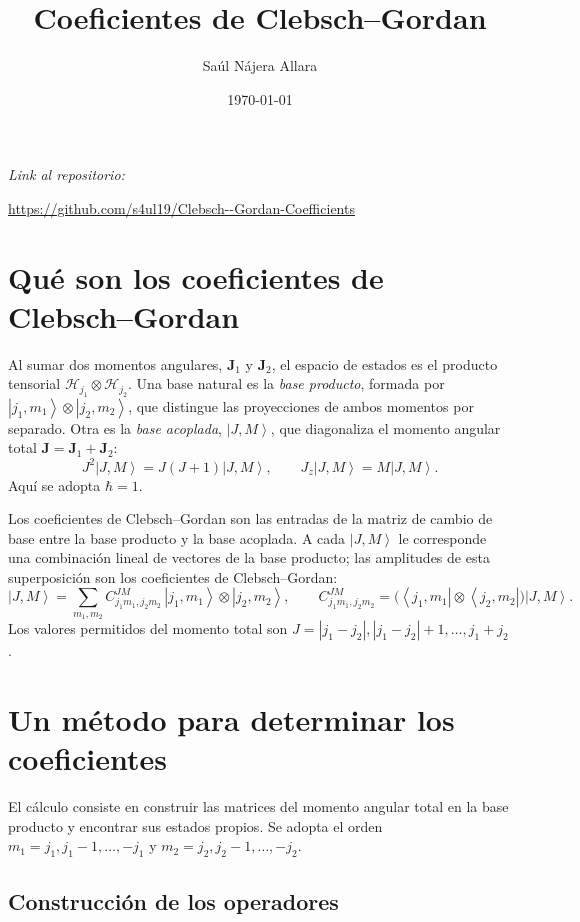 \documentclass[11pt,a4paper]{article}
\title{Coeficientes de Clebsch--Gordan}
\author{Saúl Nájera Allara}
\date{\today}
\newcommand{\ket}[1]{\left|#1\right\rangle}
\newcommand{\bra}[1]{\left\langle#1\right|}
\begin{document}
\maketitle
\hypertarget{indice}{}
\tableofcontents
\clearpage
\textit{Link al repositorio:}

\url{https://github.com/s4ul19/Clebsch--Gordan-Coefficients}  

\section{Qué son los coeficientes de Clebsch--Gordan}

Al sumar dos momentos angulares, $\mathbf{J}_1$ y $\mathbf{J}_2$, el espacio
de estados es el producto tensorial
$\mathcal{H}_{j_1}\otimes\mathcal{H}_{j_2}$. Una base natural es la
\emph{base producto}, formada por
$\ket{j_1,m_1}\otimes\ket{j_2,m_2}$, que distingue las proyecciones de
ambos momentos por separado. Otra es la \emph{base acoplada},
$\ket{J,M}$, que diagonaliza el momento angular total
$\mathbf{J}=\mathbf{J}_1+\mathbf{J}_2$:
\begin{equation}
 J^2\ket{J,M}=J(J+1)\ket{J,M},\qquad
 J_z\ket{J,M}=M\ket{J,M}.
\end{equation}
Aquí se adopta $\hbar=1$. 

Los coeficientes de Clebsch--Gordan son las entradas de la matriz de cambio de base entre la base producto y la base acoplada.
A cada $\ket{J,M}$ le corresponde una combinación lineal de vectores de la base producto; las amplitudes de esta superposición son los coeficientes de Clebsch--Gordan:
\begin{equation}\label{eq:expansion}
 \ket{J,M}=\sum_{m_1,m_2}
 C^{JM}_{j_1m_1,j_2m_2}\,
 \ket{j_1,m_1}\otimes\ket{j_2,m_2},\qquad
 C^{JM}_{j_1m_1,j_2m_2}
 =\bigl(\bra{j_1,m_1}\otimes\bra{j_2,m_2}\bigr)\ket{J,M}.
\end{equation}
Los valores permitidos del momento total son $J=|j_1-j_2|,|j_1-j_2|+1,\ldots,j_1+j_2$.

\section{Un método para determinar los coeficientes}

El cálculo consiste en construir las matrices del momento angular total
en la base producto y encontrar sus estados propios. Se adopta el orden
$m_1=j_1,j_1-1,\ldots,-j_1$ y
$m_2=j_2,j_2-1,\ldots,-j_2$.

\subsection{Construcción de los operadores}
\end{document}
